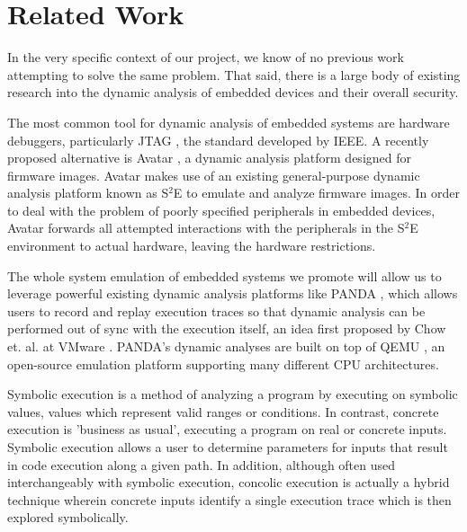 \documentclass[letterpaper, 11 pt, conference]{ieeeconf}
\begin{document}
\section{Related Work} \label{relatedWork}
In the very specific context of our project, we know of no previous work attempting to solve the same problem. That said, there is a large body of existing research into the dynamic analysis of embedded devices and their overall security.

The most common tool for dynamic analysis of embedded systems are hardware debuggers, particularly JTAG \cite{jtag}, the standard developed by IEEE. 
A recently proposed alternative is Avatar \cite{avatar}, a dynamic analysis platform designed for firmware images. Avatar makes use of an existing general-purpose dynamic analysis platform known as S$^2$E \cite{s2e} to emulate and analyze firmware images. In order to deal with the problem of poorly specified peripherals in embedded devices, Avatar forwards all attempted interactions with the peripherals in the S$^2$E environment to actual hardware, leaving the hardware restrictions. 

The whole system emulation of embedded systems we promote will allow us to leverage powerful existing dynamic analysis platforms like PANDA \cite{panda}, which allows users to record and replay execution traces so that dynamic analysis can be performed out of sync with the execution itself, an idea first proposed by Chow et. al. at VMware \cite{jchow}. PANDA's dynamic analyses are built on top of QEMU \cite{qemu}, an open-source emulation platform supporting many different CPU architectures. 

Symbolic execution \cite{jking} is a method of analyzing a program by executing on symbolic values, values which represent valid ranges or conditions. In contrast, concrete execution is 'business as usual', executing a program on real or concrete inputs. Symbolic execution allows a user to determine parameters for inputs that result in code execution along a given path. In addition, although often used interchangeably with symbolic execution, concolic execution \cite{ksen} is actually a hybrid technique wherein concrete inputs identify a single execution trace which is then explored symbolically. 
\end{document}
